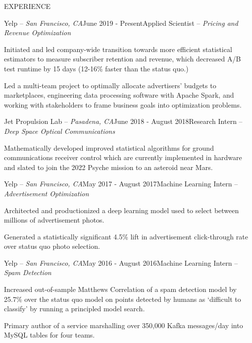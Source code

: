\documentclass{resume} %
\begin{document}
 

\vspace{-1em}
\begin{rSection}{EXPERIENCE}

\begin{rSubsection}{Yelp -- {\it San Francisco, CA}}{June 2019 - Present}{Applied Scientist -- {\sl Pricing and Revenue Optimization}}

\item Initiated and led company-wide transition towards more efficient statistical estimators to measure subscriber retention and revenue, which decreased A/B test runtime by 15 days (12-16\% faster than the status quo.)

\item Led a multi-team project to optimally allocate advertisers' budgets to marketplaces, engineering data processing software with Apache Spark, and working with stakeholders to frame business goals into optimization problems.

\end{rSubsection}

\begin{rSubsection}{Jet Propulsion Lab -- {\it Pasadena, CA}}{June 2018 - August 2018}{Research Intern -- {\sl Deep Space Optical Communications}}

\item Mathematically developed improved statistical algorithms for ground communications receiver control which are currently implemented in hardware and slated to join the 2022 Psyche mission to an asteroid near Mars.
\end{rSubsection}

\begin{rSubsection}{Yelp -- {\it San Francisco, CA}}{May 2017 - August 2017}{Machine Learning Intern -- {\sl Advertisement Optimization}}

\item Architected and productionized a deep learning model used to select between millions of advertisement photos.
\item Generated a statistically significant 4.5\% lift in advertisement click-through rate over status quo photo selection.
\end{rSubsection}

\begin{rSubsection}{Yelp -- {\it San Francisco, CA}}{May 2016 - August 2016}{Machine Learning Intern -- {\sl Spam Detection}}

\item Increased out-of-sample Matthews Correlation of a spam detection model by 25.7\% over the status quo model on points detected by humans as `difficult to classify' by running a principled model search.
\item Primary author of a service marshalling over 350,000 Kafka messages/day into MySQL tables for four teams.
\end{rSubsection}

\end{rSection}
\end{document}
